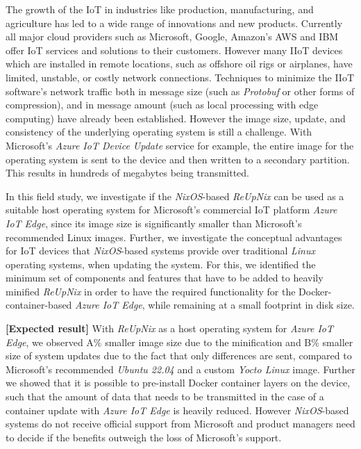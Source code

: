 
The growth of the \ac{IoT} in industries like production, manufacturing, and
agriculture has led to a wide range of innovations and new products. Currently
all major cloud providers such as Microsoft, Google, Amazon's AWS and IBM offer
\ac{IoT} services and solutions to their customers. However many \ac{IIoT} devices
which are installed in remote locations, such as offshore oil rigs or airplanes,
have limited, unstable, or costly network connections. Techniques to
minimize the \ac{IIoT} software’s network traffic both in message size
(such as \textit{Protobuf} or other forms of compression), and in message amount
(such as local processing with edge computing) have already been established.
However the image size, update, and consistency of the underlying operating
system is still a challenge. With Microsoft's \textit{Azure IoT Device
Update} service for example, the entire image for the operating system is sent
to the device and then written to a secondary partition. This results in hundreds
of megabytes being transmitted.

In this field study, we investigate if the \textit{NixOS}-based \textit{ReUpNix}
can be used as a suitable host operating system for Microsoft’s commercial
\ac{IoT} platform \textit{Azure IoT Edge}, since its image size is significantly
smaller than Microsoft's recommended Linux images.
Further, we investigate the conceptual advantages for \ac{IoT}
devices that \textit{NixOS}-based systems provide over traditional \textit{Linux}
operating systems, when updating the system. For this, we identified the
minimum set of components and features that have to be added to heavily minified
\textit{ReUpNix} in order to have the required functionality for the
Docker-container-based \textit{Azure IoT Edge}, while remaining at a small
footprint in disk size.

\textbf{[Expected result]}
With \textit{ReUpNix} as a host operating system for \textit{Azure IoT Edge}, we
observed A\% smaller image size due to the minification and B\% smaller size of
system updates due to the fact that only differences are sent, compared to
Microsoft's recommended \textit{Ubuntu 22.04} and a custom \textit{Yocto Linux}
image. Further we showed that it is possible to pre-install Docker container
layers on the device, such that the amount of data that needs to be transmitted
in the case of a container update with \textit{Azure IoT Edge} is heavily reduced.
However \textit{NixOS}-based systems do not receive official support from
Microsoft and product managers need to decide if the benefits outweigh the loss
of Microsoft's support.





